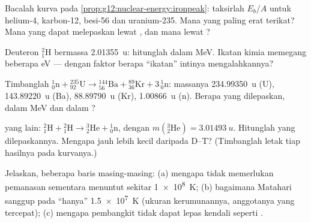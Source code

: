 \begin{exercise}[$\star$]\label{exo:g12:nuclear-energy:5}
Bacalah kurva pada \cref{prop:g12:nuclear-energy:ironpeak}: taksirlah $E_b/A$ untuk
helium-4, karbon-12, besi-56 dan uranium-235. Mana yang paling erat terikat?
Mana yang dapat melepaskan  lewat , dan mana lewat ?
\end{exercise}

\begin{exercise}[$\star\star$]\label{exo:g12:nuclear-energy:6}
Deuteron ${}^{2}_{1}\mathrm{H}$ bermassa \qty{2.01355}{u}: hitunglah
 dalam \unit{MeV}. Ikatan kimia memegang beberapa \unit{eV} --- dengan
faktor berapa ``ikatan'' intinya mengalahkannya?
\end{exercise}

\begin{exercise}[$\star\star$]\label{exo:g12:nuclear-energy:7}
Timbanglah  ${}^{1}_{0}\mathrm{n} + {}^{235}_{92}\mathrm{U} \to
{}^{144}_{56}\mathrm{Ba} + {}^{89}_{36}\mathrm{Kr} + 3\,{}^{1}_{0}\mathrm{n}$:
massanya \qty{234.99350}{u} (U), \qty{143.89220}{u} (Ba), \qty{88.89790}{u}
(Kr), \qty{1.00866}{u} (n). Berapa  yang dilepaskan, dalam \unit{MeV} dan dalam ?
\end{exercise}

\begin{exercise}[$\star\star$]\label{exo:g12:nuclear-energy:8}
 yang lain: ${}^{2}_{1}\mathrm{H} + {}^{2}_{1}\mathrm{H} \to
{}^{3}_{2}\mathrm{He} + {}^{1}_{0}\mathrm{n}$, dengan
$m({}^{3}_{2}\mathrm{He}) = \qty{3.01493}{u}$. Hitunglah  yang dilepaskannya.
Mengapa jauh lebih kecil daripada D--T? (Timbanglah letak tiap hasilnya pada kurvanya.)
\end{exercise}

\begin{exercise}[$\star\star$]\label{exo:g12:nuclear-energy:9}
Jelaskan, beberapa baris masing-masing: (a) mengapa  tidak memerlukan pemanasan sementara 
menuntut sekitar \qty{1e8}{K}; (b) bagaimana Matahari sanggup pada ``hanya'' \qty{1.5e7}{K}
(ukuran kerumunannya, anggotanya yang tercepat); (c) mengapa pembangkit  tidak dapat
lepas kendali seperti .
\end{exercise}

